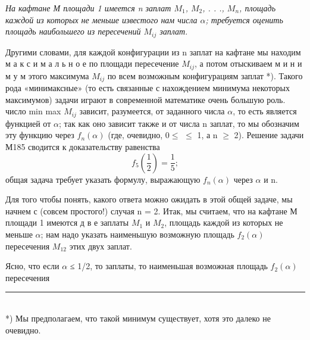 \begin{multicols}{2}
\small
\textit{На кафтане М площади 1 имеется n заплат $M_{1}$, $M_{2}$, . . ., $M_{n}$, площадь каждой из которых не меньше известого нам числа $\alpha$; требуется оценить площадь наибольшего из пересечений $M_{ij}$ заплат}.\par
Другими словами, для каждой конфигурации из n заплат на кафтане мы находим м а к с и м а л ь н о е по площади пересечение $M_{ij}$, а потом отыскиваем м и н и м у м этого максимума $M_{ij}$ по всем возможным конфигурациям заплат *). Такого рода «минимаксные» (то есть связанные с нахождением минимума некоторых максимумов) задачи играют в современной математике очень большую роль.
 число min max $M_{ij}$ зависит, разумеется, от заданного числа $\alpha$, то есть является функцией от $\alpha$; так как оно зависит также и от числа n заплат, то мы обозначим эту функцию через $f_n(\alpha)$ (где, очевидно, $0\leq$ \alpha $ \leq$ 1, а n $\geq$ 2). Решение задачи М185 сводится к доказательству равенства
$$f_5(\frac{1}{2}) = \frac{1}{5};$$
общая задача требует указать формулу, выражающую $f_n(\alpha)$ через $\alpha$ и n.

\small
Для того чтобы понять, какого ответа можно ожидать в этой общей задаче, мы начнем с (совсем простого!) случая n = 2. Итак, мы считаем, что на кафтане М площади 1 имеются д в е заплаты $M_{1}$ и $M_{2}$, площадь каждой из которых не меньше $\alpha$; нам надо указать наименьшую возможную площадь $f_2(\alpha)$ пересечения $M_{12}$ этих двух заплат.

Ясно, что если $\alpha$ ≤ 1/2, то заплаты, то наименьшая возможная площадь  $f_2(\alpha)$ пересечения
\rule[1mm]{60mm}{.1pt}\\
    \indent
    \small
    *) Мы предполагаем, что такой минимум существует, хотя это далеко не очевидно.\par
    \small





\end{multicols}

